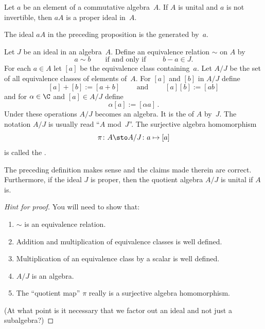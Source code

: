 \begin{prop}\label{000553} Let $a$ be an element of a commutative algebra~$A$.  If $A$ is
unital and $a$ is not invertible, then $aA$ is a proper ideal in~$A$.
\end{prop}

\begin{defn}\label{000554} The ideal $aA$ in the preceding proposition is the
 generated by~$a$.
\end{defn}

\begin{defn}\label{000555} Let $J$ be an ideal in an algebra~$A$.  Define an
equivalence relation $\sim$ on $A$ by
  \[ a \sim b \qquad \text{if and only if } \qquad b-a \in J. \]
For each $a \in A$ let $[a]$ be the equivalence class containing~$a$.  Let $A/J$ be the
set of all equivalence classes of elements of~$A$.  For $[a]$ and $[b]$ in $A/J$ define
  \[ [a] + [b] := [a+b] \qquad \text{ and } \qquad [a][b] := [ab] \]
and for $\alpha \in \C$ and $[a] \in A/J$ define
  \[\alpha[a] := [\alpha a] \,. \]
Under these operations $A/J$ becomes an algebra.  It is the
 of $A$ by~$J$.  The notation $A/J$ is usually read ``$A$ mod~$J$''.
The surjective algebra homomorphism
  \[ \pi\colon A \sto A/J\colon a \mapsto [a]\]
is called the
.
\end{defn}

\begin{prop} The preceding definition makes sense and the claims made therein are correct.
Furthermore, if the ideal $J$ is proper, then the quotient algebra $A/J$ is unital if $A$ is.
\end{prop}

\begin{proof}[\emph{Hint for proof}] You will need to show that:
 \begin{enumerate}
  \item[(a)] $\sim$ is an equivalence relation.
  \item[(b)] Addition and multiplication of equivalence classes is well defined.
  \item[(c)] Multiplication of an equivalence class by a scalar is well defined.
  \item[(d)] $A/J$ is an algebra.
  \item[(e)] The ``quotient map'' $\pi$ really is a surjective algebra homomorphism.
 \end{enumerate}
(At what point is it necessary that we factor out an ideal and not just a subalgebra?) \ns
\end{proof}

